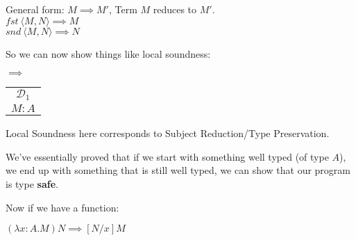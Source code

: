 \documentclass[12 pt]{article}
\begin{document}
    General form: $M \implies M'$, Term $M$ reduces to $M'$.
    \\ $fst\ \langle M, N \rangle \implies M$
    \\ $snd\ \langle M, N \rangle \implies N$

    So we can now show things like local soundness:
    \begin{center}
      \noLine
      \noLine
      \DP
      $\implies$
      \begin{tabular}{c}
        $\mathcal{D}_1$
        \\ $M : A$
      \end{tabular}
    \end{center}
    Local Soundness here corresponds to Subject Reduction/Type
    Preservation.

    We've essentially proved that if we start with something well
    typed (of type $A$), we end up with something that is still well
    typed, we can show that our program is type \textbf{safe}.

    Now if we have a function:

    $(\lambda x : A . M) N \implies [N/x] M$
\end{document}

